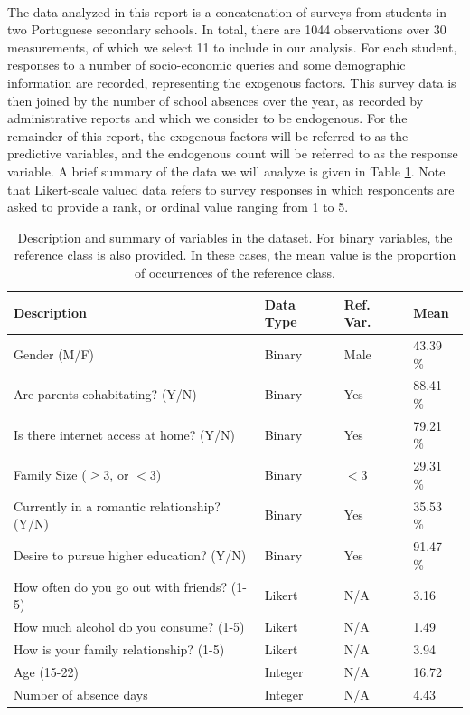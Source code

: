 \documentclass[12pt, titlepage]{article}
\begin{document}
	\paragraph{} The data analyzed in this report is a concatenation of surveys from students in two Portuguese secondary schools. In total, there are 1044 observations over 30 measurements, of which we select 11 to include in our analysis. For each student, responses to a number of socio-economic queries and some demographic information are recorded, representing the exogenous factors. This survey data is then joined by the number of school absences over the year, as recorded by administrative reports and which we consider to be endogenous. For the remainder of this report, the exogenous factors will be referred to as the predictive variables, and the endogenous count will be referred to as the response variable. A brief summary of the data we will analyze is given in Table \ref{data}. Note that Likert-scale valued data refers to survey responses in which respondents are asked to provide a rank, or ordinal value ranging from 1 to 5. 	
\begin{table}[H]
	\centering
	\begin{tabular}{|l|l|l|l|}
		\hline
		\textbf{Description} & \textbf{Data Type} & \textbf{Ref. Var.} & \textbf{Mean} \\
		\hline
		Gender (M/F) & Binary & Male & 43.39 \% \\
		Are parents cohabitating? (Y/N) & Binary & Yes & 88.41 \% \\
		Is there internet access at home? (Y/N) & Binary & Yes & 79.21 \% \\
		Family Size ($\geq 3$, or $<3$) & Binary & $<3$ & 29.31 \% \\
		Currently in a romantic relationship? (Y/N) & Binary & Yes & 35.53 \% \\
		Desire to pursue higher education? (Y/N) & Binary & Yes & 91.47 \% \\
		How often do you go out with friends? (1-5) & Likert & N/A & 3.16 \\
		How much alcohol do you consume? (1-5) & Likert & N/A & 1.49 \\
		How is your family relationship? (1-5) & Likert & N/A & 3.94 \\
		Age (15-22) & Integer & N/A & 16.72 \\
		\hline
		Number of absence days & Integer & N/A & 4.43 \\ \hline
	\end{tabular}
	\caption{Description and summary of variables in the dataset. For binary variables, the reference class is also provided. In these cases, the mean value is the proportion of occurrences of the reference class.}
	\label{data}
\end{table}
\end{document}

